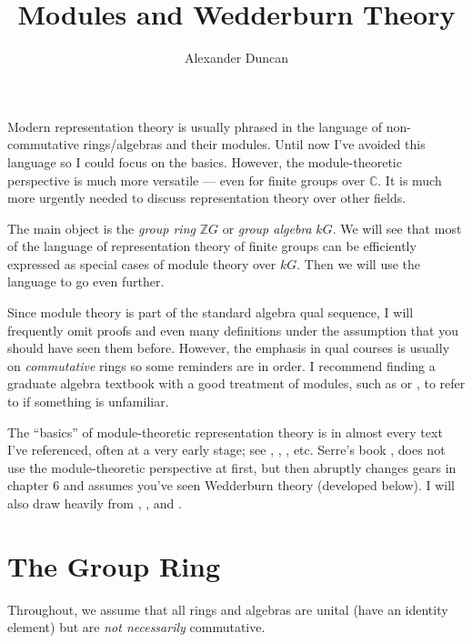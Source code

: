 \documentclass[12pt]{article}
\theoremstyle{plain}
\theoremstyle{definition}
\theoremstyle{remark}
\numberwithin{equation}{section}
\begin{document}
\title{Modules and Wedderburn Theory}
\author{Alexander Duncan}

\maketitle

Modern representation theory is usually phrased in the language of
non-commutative rings/algebras and their modules.
Until now I've avoided this language so I could focus on the basics.
However, the module-theoretic perspective is much more versatile --- even
for finite groups over $\mathbb{C}$.
It is much more urgently needed to discuss representation
theory over other fields. 

The main object is the \emph{group ring} $\mathbb{Z}G$
or \emph{group algebra} $kG$.  We will see that most of the language of
representation theory of finite groups can be efficiently expressed
as special cases of module theory over $kG$.
Then we will use the language to go even further.

Since module theory is part of the standard algebra qual sequence,
I will frequently omit proofs and even many definitions under the
assumption that you should have seen them before.
However, the emphasis in qual courses is usually on
\emph{commutative} rings so some reminders are in order.
I recommend finding a graduate algebra textbook with a good treatment of
modules, such as \cite[\S{10}]{DF} or \cite[\S{III}]{Lang},
to refer to if something is unfamiliar.

The ``basics'' of module-theoretic representation theory is in
almost every text I've referenced, often at a very early stage; 
see \cite{DF}, \cite{Etingof}, \cite{FultonHarris}, \cite{Lang} etc.
Serre's book \cite{Serre}, does not use the module-theoretic
perspective at first, but then abruptly changes gears in chapter 6 and
assumes you've seen Wedderburn theory (developed below).
I will also draw heavily from \cite[\S{12,13}]{AlperinBell},
\cite{AlperinLRT}, and \cite{CurtisReiner}.


\section{The Group Ring}

Throughout, we assume that all rings and algebras are unital (have an identity
element) but are \emph{not necessarily} commutative.
\end{document}
